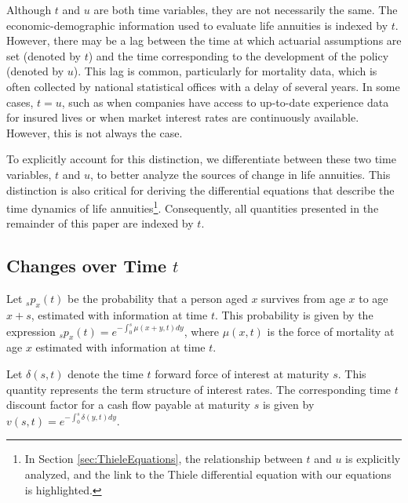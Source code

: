 \documentclass[12pt]{article}
\begin{document}
Although \( t \) and \( u \) are both time variables, they are not necessarily the same. The economic-demographic information used to evaluate life annuities is indexed by \( t \). However, there may be a lag between the time at which actuarial assumptions are set (denoted by \( t \)) and the time corresponding to the development of the policy (denoted by \( u \)). This lag is common, particularly for mortality data, which is often collected by national statistical offices with a delay of several years. In some cases, \( t = u \), such as when companies have access to up-to-date experience data for insured lives or when market interest rates are continuously available. However, this is not always the case.

To explicitly account for this distinction, we differentiate between these two time variables, \( t \) and \( u \), to better analyze the sources of change in life annuities. This distinction is also critical for deriving the differential equations that describe the time dynamics of life annuities\footnote{In Section \ref{sec:ThieleEquations}, the relationship between \( t \) and \( u \) is explicitly analyzed, and the link to the Thiele differential equation with our equations is highlighted.}. Consequently, all quantities presented in the remainder of this paper are indexed by \( t \).


\subsection{Changes over Time $t$}


Let \({}_s p_x(t) \) be the probability that a person aged \( x \) survives from age \( x \) to age \( x+s \), estimated with information at time $t$. This probability is given by the expression ${}_sp_x(t)=e^{-\int_{0}^{s}\mu(x+y,t)dy}$, where \(\mu(x,t)\) is the force of mortality at age \(x\) estimated with information at time $t$.

Let \( \delta(s,t) \) denote the time \( t \) forward force of interest at maturity \( s \). This quantity represents the term structure of interest rates. The corresponding time \( t \) discount factor for a cash flow payable at maturity \( s \) is given by ${v}(s,t)=e^{-\int_{0}^{s}\delta(y,t)dy}$.
\end{document}
